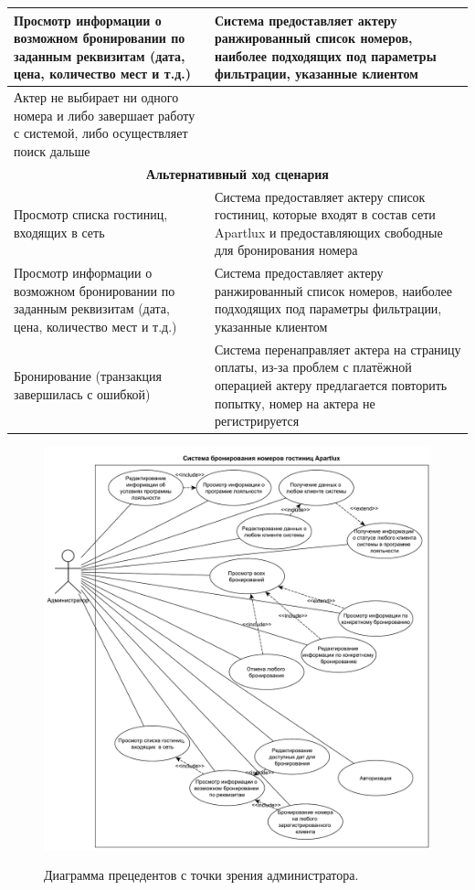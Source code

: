 \begin{longtable}{| p{6cm} | p{10cm} |}
	Просмотр информации о возможном бронировании по заданным реквизитам (дата, цена, количество мест и т.д.)
	&
	Система предоставляет актеру ранжированный список номеров, наиболее подходящих под параметры фильтрации, указанные клиентом \\
	\hline
	
	Актер не выбирает ни одного номера и либо завершает работу с системой, либо осуществляет поиск дальше
	&
	\\
	\hline
	
	\multicolumn{2}{|c|}{\textbf{Альтернативный ход сценария}} \\
	\hline
	
	Просмотр списка гостиниц, входящих в сеть
	&
	Система предоставляет актеру список гостиниц, которые входят в состав сети Apartlux и предоставляющих свободные для бронирования номера \\
	\hline
	
	Просмотр информации о возможном бронировании по заданным реквизитам (дата, цена, количество мест и т.д.)
	&
	Система предоставляет актеру ранжированный список номеров, наиболее подходящих под параметры фильтрации, указанные клиентом \\
	\hline
	
	Бронирование (транзакция завершилась с ошибкой)
	&
	Система перенаправляет актера на страницу оплаты, из-за проблем с платёжной операцией актеру предлагается повторить попытку, номер на актера не регистрируется
\end{longtable}

\begin{figure}[h]
	\begin{center}
		{\includegraphics[scale = 0.54]{img/use-case/admin.pdf}}
		\caption{Диаграмма прецедентов с точки зрения администратора.}
		\label{fig:use-case-admin}
	\end{center}
\end{figure}

\pagebreak